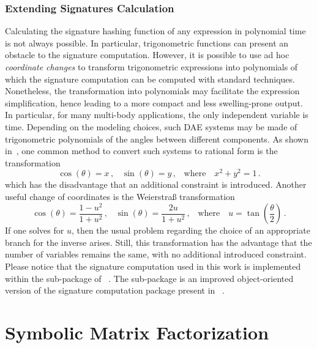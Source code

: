 \subsubsection{Extending Signatures Calculation}

Calculating the signature hashing function of any expression in polynomial time is not always possible. In particular, trigonometric functions can present an obstacle to the signature computation. However, it is possible to use ad hoc \emph{coordinate changes} to transform trigonometric expressions into polynomials of which the signature computation can be computed with standard techniques. Nonetheless, the transformation into polynomials may facilitate the expression simplification, hence leading to a more compact and less swelling-prone output. In particular, for many multi-body applications, the only independent variable is time. Depending on the modeling choices, such \ac{DAE} systems may be made of trigonometric polynomials of the angles between different components. As shown in~\cite{zhou2005implicit}, one common method to convert such systems to rational form is the transformation
%
\begin{equation}
  \label{chap3:eq:zhou}
  \cos(\theta) = x \, \text{,} \quad
  \sin(\theta) = y \, \text{,}
  \quad \text{where} \quad
  x^2 + y^2 = 1 \, \text{.}
\end{equation}
%
which has the disadvantage that an additional constraint is introduced. Another useful change of coordinates is the Weierstra{\ss} transformation~\cite{cox1994ideals}
%
\begin{equation}
  \label{chap3:eq:weierstrass}
  \cos(\theta) = \dfrac{1 - u^2}{1 + u^2} \, \text{,} \quad
  \sin(\theta) = \dfrac{2u}{1 + u^2} \, \text{,}
  \quad \text{where} \quad
  u = \tan\left(\dfrac{\theta}{2}\right) \, \text{.}
\end{equation}
%
If one solves for $u$, then the usual problem regarding the choice of an appropriate branch for the inverse arises. Still, this transformation has the advantage that the number of variables remains the same, with no additional introduced constraint. Please notice that the signature computation used in this work is implemented within the \SIG{} sub-package of \LEM{}~\cite{lem}. The \SIG{} sub-package is an improved object-oriented version of the signature computation package present in \LULEM{}~\cite{carette2006linear}.


\section{Symbolic Matrix Factorization}
\label{chap3:sec:last}

